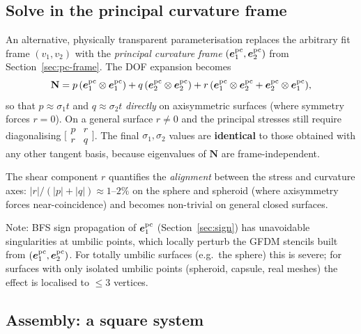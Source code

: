 \documentclass[11pt]{article}
\newcommand{\vv}[1]{\bm{#1}}          %
\newcommand{\Nb}{\mathbf{N}}           %
\newcommand{\tp}{\otimes}              %
\begin{document}
\subsection{Solve in the principal curvature frame}
\label{sec:pc-frame-solve}

An alternative, physically transparent parameterisation replaces the arbitrary
fit frame $(v_1,v_2)$ with the \emph{principal curvature frame}
$(\vv{e}_1^{\rm pc},\vv{e}_2^{\rm pc})$ from Section~\ref{sec:pc-frame}.
The DOF expansion becomes
\begin{equation}
  \Nb = p\,(\vv{e}_1^{\rm pc}\tp\vv{e}_1^{\rm pc})
      + q\,(\vv{e}_2^{\rm pc}\tp\vv{e}_2^{\rm pc})
      + r\,(\vv{e}_1^{\rm pc}\tp\vv{e}_2^{\rm pc}
           +\vv{e}_2^{\rm pc}\tp\vv{e}_1^{\rm pc}),
  \label{eq:dofs-pc}
\end{equation}
so that $p\approx\sigma_1 t$ and $q\approx\sigma_2 t$ \emph{directly} on
axisymmetric surfaces (where symmetry forces $r=0$).  On a general surface
$r\ne 0$ and the principal stresses still require diagonalising
$\bigl[\begin{smallmatrix}p&r\\r&q\end{smallmatrix}\bigr]$.  The final
$\sigma_1,\sigma_2$ values are \textbf{identical} to those obtained with any
other tangent basis, because eigenvalues of $\Nb$ are frame-independent.

The shear component $r$ quantifies the \emph{alignment} between the stress and
curvature axes: $|r|/(|p|+|q|)\approx 1$--$2\%$ on the sphere and spheroid
(where axisymmetry forces near-coincidence) and becomes non-trivial on
general closed surfaces.

Note: BFS sign propagation of $\vv{e}_1^{\rm pc}$ (Section~\ref{sec:sign})
has unavoidable singularities at umbilic points, which locally perturb the
GFDM stencils built from $(\vv{e}_1^{\rm pc},\vv{e}_2^{\rm pc})$.  For
totally umbilic surfaces (e.g.\ the sphere) this is severe; for surfaces with
only isolated umbilic points (spheroid, capsule, real meshes) the effect is
localised to $\le 3$ vertices.

\subsection{Assembly: a square system}
\label{sec:assembly}
\end{document}
